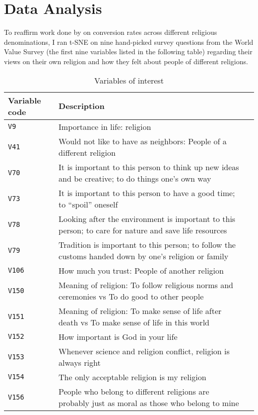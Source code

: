 \documentclass{article}
\begin{document}
	\section{Data Analysis}
	To reaffirm work done by \cite{relig_convert} on conversion rates across different religious denominations, I ran t-SNE on nine hand-picked survey questions from the World Value Survey (the first nine variables listed in the following table) regarding their views on their own religion and how they felt about people of different religions.
	
	\begin{table}[h]
		\caption{Variables of interest}
		\label{wvs-vars}
		\centering
		\begin{tabular}{lll}
			\toprule
			Variable code & Description  \\
			\midrule
			\texttt{V9} & Importance in life: religion \\
			\texttt{V41} & Would not like to have as neighbors: People of a different religion \\
			\texttt{V70} & It is important to this person to think up new ideas and be creative; to do things one’s own way \\
			\texttt{V73} & It is important to this person to have a good time; to “spoil” oneself \\
			\texttt{V78} & Looking after the environment is important to this person; to care for nature and save life resources \\
			\texttt{V79} & Tradition is important to this person; to follow the customs handed down by one’s religion or family \\
			\texttt{V106} & How much you trust: People of another religion \\
			\texttt{V150} & Meaning of religion: To follow religious norms and ceremonies vs To do good to other people \\
			\texttt{V151} & Meaning of religion: To make sense of life after death vs To make sense of life in this world \\
			\texttt{V152} & How important is God in your life \\
			\texttt{V153} & Whenever science and religion conflict, religion is always right \\
			\texttt{V154} & The only acceptable religion is my religion \\
			\texttt{V156} & People who belong to different religions are probably just as moral as those who belong to mine \\
			\bottomrule
		\end{tabular}
	\end{table}
	
\end{document}
